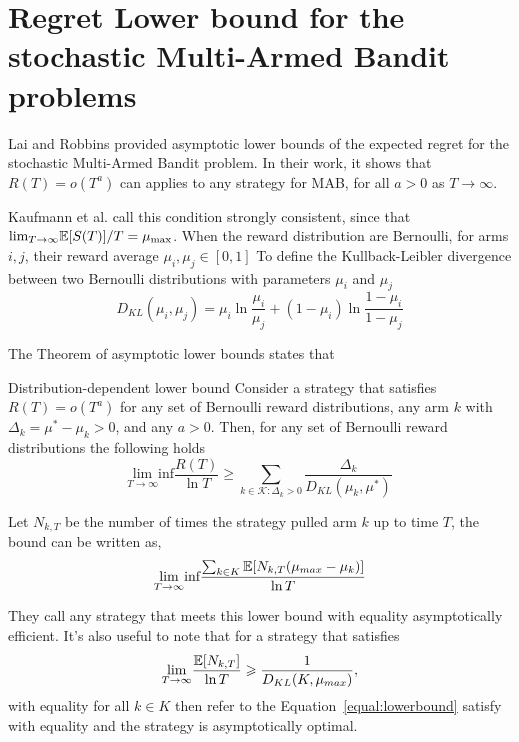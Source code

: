 \section{Regret Lower bound for the stochastic Multi-Armed Bandit problems}
\label{sec:lowerbound}

Lai and Robbins \cite{lai1985asymptotically} provided asymptotic lower bounds of the expected regret for the stochastic Multi-Armed Bandit problem. In their work, it shows that $R(T) = o(T^a)$ can applies to any strategy for MAB, for all $a>0$ as $T\rightarrow \infty$. 

Kaufmann et al.\cite{Kaufmann12} call this condition strongly consistent, since that $\text{lim}_{T\rightarrow \infty} \mathbb{E}[S(T)] /T =\mu_{\text{max}}$. When the reward distribution are Bernoulli, for arms $i,j$, their reward average $\mu_i,\mu_j \in [0,1]$ To define the Kullback-Leibler divergence between two Bernoulli distributions with parameters $\mu_i$ and $\mu_j$
\[D_{KL}(\mu_i,\mu_j) = \mu_i\ln{\frac{\mu_i}{\mu_j}}+(1-\mu_i)\ln{\frac{1-\mu_i}{1-\mu_j}}
\] 

The Theorem of asymptotic lower bounds states that 
\begin{theo}{Distribution-dependent lower bound}
\label{theo:lowerbound}
Consider a strategy that satisfies $R(T) = o(T^a)$ for any set of Bernoulli reward distributions, any arm $k$ with $\Delta_k = \mu^{\ast}-\mu_k >0$, and any $a>0$. Then, for any set of Bernoulli reward distributions the following holds
\begin{equation}
\label{equal:lowerbound}
\underset{T\rightarrow\infty}{\text{lim}} \text{inf}\frac{R(T)}{\ln{T}} \geqslant \sum_{k\in \mathscr{K}: \Delta_k>0} \frac{\Delta_k}{D_{KL}(\mu_k,\mu^{\ast})}
\end{equation}
\end{theo}
Let $N_{k,T}$ be the number of times the strategy pulled arm $k$ up to time $T$, the bound can be written as, 
\[\underset{T\rightarrow \infty}{\text{lim}}\text{inf} \frac{\sum_{k\in K}\mathbb{E}[N_{k,T}(\mu_{max}-\mu_k)]}{\ln{T}}
\]

They call any strategy that meets this lower bound with equality asymptotically efficient. It's also useful to note that for a strategy that satisfies
\[\underset{T\rightarrow \infty}{\text{lim}}\frac{\mathbb{E}[N_{k,T}]}{\ln{T}} \geqslant \frac{1}{D_{KL}(K,\mu_{max})},\]
with equality for all $k\in K$ then refer to the Equation~\ref{equal:lowerbound} satisfy with equality and the strategy is asymptotically optimal.